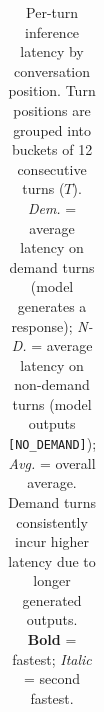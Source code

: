 \begin{table}[t]
{\begin{tabular}{@{}l|ccc|ccc|ccc|ccc|ccc@{}}
\bottomrule
\end{tabular}%
}
\caption{Per-turn inference latency by conversation position.
Turn positions are grouped into buckets of 12 consecutive turns ($T$).
\textit{Dem.} = average latency on demand turns (model generates a response);
\textit{N-D.} = average latency on non-demand turns (model outputs \texttt{[NO\_DEMAND]});
\textit{Avg.} = overall average.
Demand turns consistently incur higher latency due to longer generated outputs.
\textbf{Bold} = fastest; \textit{Italic} = second fastest.}
\label{tab:demand_latency}
\end{table}
